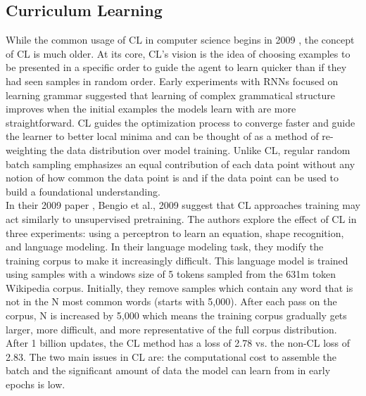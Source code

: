\subsection{Curriculum Learning}
\label{chap:prior:sec:cl:cl}
While the common usage of CL in computer science begins in 2009 \cite{Bengio2009CurriculumL}, the concept of CL is much older. At its core, CL's vision is the idea of choosing examples to be presented in a specific order to guide the agent to learn quicker than if they had seen samples in random order. Early experiments with RNNs \cite{Elman1993LearningAD} focused on learning grammar suggested that learning of complex grammatical structure improves when the initial examples the models learn with are more straightforward. CL guides the optimization process to converge faster and guide the learner to better local minima and can be thought of as a method of re-weighting the data distribution over model training. Unlike CL, regular random batch sampling emphasizes an equal contribution of each data point without any notion of how common the data point is and if the data point can be used to build a foundational understanding.\\
In their 2009 paper \cite{Bengio2009CurriculumL}, Bengio et al., 2009 suggest that CL approaches training may act similarly to unsupervised pretraining. The authors explore the effect of CL in three experiments: using a perceptron to learn an equation, shape recognition, and language modeling. In their language modeling task, they modify the training corpus to make it increasingly difficult. This language model is trained using samples with a windows size of 5 tokens sampled from the 631m token Wikipedia corpus. Initially, they remove samples which contain any word that is not in the N most common words (starts with 5,000). After each pass on the corpus, N is increased by 5,000 which means the training corpus gradually gets larger, more difficult, and more representative of the full corpus distribution. After 1 billion updates, the CL method has a loss of 2.78 vs. the non-CL loss of 2.83. The two main issues in CL are: the computational cost to assemble the batch and the significant amount of data the model can learn from in early epochs is low. \\
